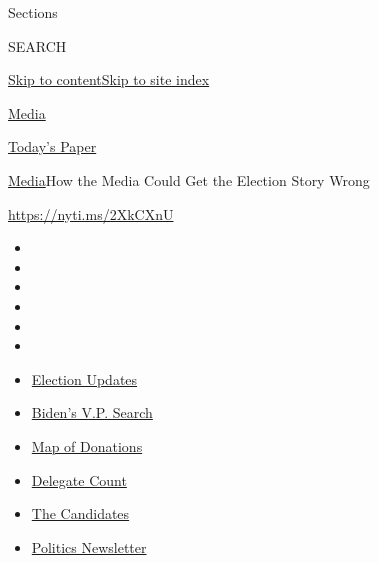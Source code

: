 Sections

SEARCH

\protect\hyperlink{site-content}{Skip to
content}\protect\hyperlink{site-index}{Skip to site index}

\href{https://www.nytimes3xbfgragh.onion/section/business/media}{Media}

\href{https://myaccount.nytimes3xbfgragh.onion/auth/login?response_type=cookie\&client_id=vi}{}

\href{https://www.nytimes3xbfgragh.onion/section/todayspaper}{Today's
Paper}

\href{/section/business/media}{Media}\textbar{}How the Media Could Get
the Election Story Wrong

\href{https://nyti.ms/2XkCXnU}{https://nyti.ms/2XkCXnU}

\begin{itemize}
\item
\item
\item
\item
\item
\item
\end{itemize}

\begin{itemize}
\item
  \href{https://www.nytimes3xbfgragh.onion/2020/08/03/us/elections/biden-vs-trump.html?action=click\&pgtype=Article\&state=default\&region=TOP_BANNER\&context=storylines_menu}{Election
  Updates}
\item
  \href{https://www.nytimes3xbfgragh.onion/article/biden-vice-president-2020.html?action=click\&pgtype=Article\&state=default\&region=TOP_BANNER\&context=storylines_menu}{Biden's
  V.P. Search}
\item
  \href{https://www.nytimes3xbfgragh.onion/interactive/2020/07/24/us/politics/trump-biden-campaign-donors.html?action=click\&pgtype=Article\&state=default\&region=TOP_BANNER\&context=storylines_menu}{Map
  of Donations}
\item
  \href{https://www.nytimes3xbfgragh.onion/interactive/2020/us/elections/delegate-count-primary-results.html?action=click\&pgtype=Article\&state=default\&region=TOP_BANNER\&context=storylines_menu}{Delegate
  Count}
\item
  \href{https://www.nytimes3xbfgragh.onion/interactive/2019/us/politics/2020-presidential-candidates.html?action=click\&pgtype=Article\&state=default\&region=TOP_BANNER\&context=storylines_menu}{The
  Candidates}
\item
  \href{https://www.nytimes3xbfgragh.onion/newsletters/politics?action=click\&pgtype=Article\&state=default\&region=TOP_BANNER\&context=storylines_menu}{Politics
  Newsletter}
\end{itemize}

